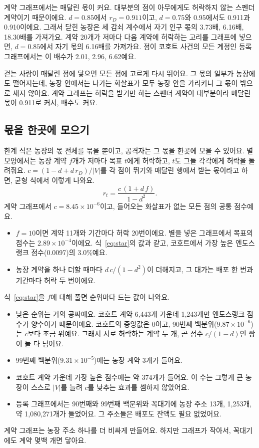 계약 그래프에서는 매달린 몫이 커요. 대부분의 점이 아무에게도 허락하지 않는 스펜더 계약이기 때문이에요. $d=0.85$에서 $r_D=0.911$이고, $d=0.75$와 $0.95$에서도 0.911과 0.910이에요. 그래서 닫힌 농장은 세 감쇠 계수에서 자기 인구 몫의 3.73배, 6.16배, 18.30배를 가져가요. 계약 20개가 저마다 다음 계약에 허락하는 고리를 그래프에 넣으면, $d=0.85$에서 자기 몫의 6.16배를 가져가요. 점이 코호트 사건의 모든 계정인 등록 그래프에서는 이 배수가 2.01, 2.96, 6.62예요.

\begin{puri}
걷는 사람이 매달린 점에 닿으면 모든 점에 고르게 다시 뛰어요. 그 몫의 일부가 농장에도 떨어지는데, 농장 안에서는 나가는 화살표가 모두 농장 안을 가리키니 그 몫이 밖으로 새지 않아요. 계약 그래프는 허락을 받기만 하는 스펜더 계약이 대부분이라 매달린 몫이 0.911로 커서, 배수도 커요.
\end{puri}

\subsection{몫을 한곳에 모으기}

한계 식은 농장의 몫 전체를 묶을 뿐이고, 공격자는 그 몫을 한곳에 모을 수 있어요. 별 모양에서는 농장 계약 $f$개가 저마다 목표 $t$에게 허락하고, $t$도 그들 각각에게 허락을 돌려줘요. $c=(1-d+d\,r_D)/|V|$를 각 점이 뛰기와 매달린 행에서 받는 몫이라고 하면, 균형 식에서 이렇게 나와요.
\begin{equation}
r_t=\frac{c\,(1+d\,f)}{1-d^{2}}.
\label{eq:star}
\end{equation}
계약 그래프에서 $c=8.45\times10^{-6}$이고, 들어오는 화살표가 없는 모든 점의 공통 점수예요.
\begin{itemize}
\item $f=10$이면 계약 11개와 기간마다 허락 20번이에요. 별을 넣은 그래프에서 목표의 점수는 $2.89\times10^{-4}$이에요. 식~\eqref{eq:star}의 값과 같고, 코호트에서 가장 높은 엔도스랭크 점수(0.0097)의 3.0\%예요.
\item 농장 계약을 하나 더할 때마다 $d\,c/(1-d^2)$이 더해지고, 그 대가는 배포 한 번과 기간마다 허락 두 번이에요.
\end{itemize}
식~\eqref{eq:star}을 $f$에 대해 풀면 순위마다 드는 값이 나와요.
\begin{itemize}
\item 낮은 순위는 거의 공짜예요. 코호트 계약 6,443개 가운데 1,243개만 엔도스랭크 점수가 양수이기 때문이에요. 코호트의 중앙값은 0이고, 90번째 백분위($9.87\times10^{-6}$)는 $c$보다 조금 위예요. 그래서 서로 허락하는 계약 두 개, 곧 점수 $c/(1-d)$인 쌍이 둘 다 넘어요.
\item 99번째 백분위($9.31\times10^{-5}$)에는 농장 계약 3개가 들어요.
\item 코호트 계약 가운데 가장 높은 점수에는 약 374개가 들어요. 이 수는 그렇게 큰 농장이 스스로 $|V|$를 늘려 $c$를 낮추는 효과를 셈하지 않았어요.
\item 등록 그래프에서는 90번째와 99번째 백분위와 꼭대기에 농장 주소 13개, 1,253개, 약 1,080,271개가 들었어요. 그 주소들은 배포도 잔액도 필요 없었어요.
\end{itemize}
계약 그래프는 농장 주소 하나를 더 비싸게 만들어요. 하지만 그래프가 작아서, 꼭대기에도 계약 몇백 개면 닿아요.

